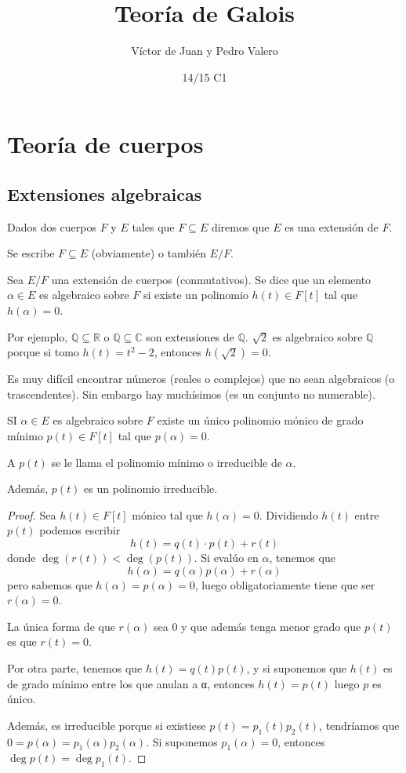 \documentclass{apuntes}
\title{Teoría de Galois}
\author{Víctor de Juan y Pedro Valero}
\date{14/15 C1}
\begin{document}
\pagestyle{plain}
\maketitle

\tableofcontents
\newpage

\chapter{Teoría de cuerpos}

\section{Extensiones algebraicas}

\begin{defn}
Dados dos cuerpos $F$ y $E$ tales que $F⊆E$ diremos que $E$ es una extensión de $F$.

Se escribe $F⊆E$ (obviamente) o también $E/F$.
\end{defn}

\begin{defn}
Sea $E/F$ una extensión de cuerpos (conmutativos). Se dice que un elemento $α∈E$ es algebraico sobre $F$ si existe un polinomio $h(t) ∈ F[t]$ tal que $h(α) = 0$.
\end{defn}

Por ejemplo, $ℚ⊆ℝ$ o $ℚ⊆ℂ$ son extensiones de $ℚ$. $\sqrt{2}$ es algebraico sobre $ℚ$ porque si tomo $h(t) = t^2 - 2$, entonces $h(\sqrt{2}) = 0$.

Es muy difícil encontrar números (reales o complejos) que no sean algebraicos (o trascendentes). Sin embargo hay muchísimos (es un conjunto no numerable).

\begin{prop} SI $α∈E$ es algebraico sobre $F$ existe un único polinomio mónico de grado mínimo $p(t) ∈ F[t]$ tal que $p(α) = 0$.

A $p(t)$ se le llama el polinomio mínimo o irreducible de $α$.

Además, $p(t)$ es un polinomio irreducible.
\end{prop}

\begin{proof}
Sea $h(t) ∈ F[t]$ mónico tal que $h(α) = 0$. Dividiendo $h(t)$ entre $p(t)$ podemos escribir \[ h(t) = q(t) · p(t) + r(t) \] donde $\deg(r(t)) < \deg(p(t))$. Si evalúo en $α$, tenemos que \[ h(α) = q(α)p(α) + r(α) \] pero sabemos que $h(α) = p(α) = 0$, luego obligatoriamente tiene que ser $r(α) = 0$.

La única forma de que $r(α)$ sea 0 y que además tenga menor grado que $p(t)$ es que $r(t) = 0$.

Por otra parte, tenemos que $h(t) = q(t)p(t)$, y si suponemos que $h(t)$ es de grado mínimo entre los que anulan a α, entonces $h(t) = p(t)$ luego $p$ es único.

Además, es irreducible porque si existiese $p(t) = p_1(t) p_2(t)$, tendríamos que $0 = p(α) = p_1(α) p_2(α)$. Si suponemos $p_1(α) = 0$, entonces $\deg p(t) = \deg p_1(t)$.
\end{proof}
\end{document}
